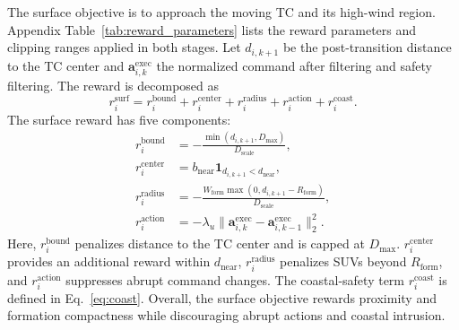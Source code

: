 \documentclass[a4paper,fleqn]{cas-dc}
\begin{document}
The surface objective is to approach the moving TC and its high-wind region.
Appendix Table~\ref{tab:reward_parameters} lists the reward parameters and
clipping ranges applied in both stages. Let \(d_{i,k+1}\) be the post-transition
distance to the TC center and
\(\mathbf{a}_{i,k}^{\mathrm{exec}}\) the normalized command after filtering and safety
filtering.
The reward is decomposed as
\begin{equation}
r_i^{\mathrm{surf}}
=r_i^{\mathrm{bound}}
+r_i^{\mathrm{center}}
+r_i^{\mathrm{radius}}
+r_i^{\mathrm{action}}
+r_i^{\mathrm{coast}}.
\label{eq:surface_reward}
\end{equation}
The surface reward has five components:
\begin{equation}
\begin{aligned}
r_i^{\mathrm{bound}}
&=-\frac{\min(d_{i,k+1},D_{\max})}{D_{\mathrm{scale}}},\\
r_i^{\mathrm{center}}
&=b_{\mathrm{near}}\mathbf{1}_{d_{i,k+1}<d_{\mathrm{near}}},\\
r_i^{\mathrm{radius}}
&=-\frac{W_{\mathrm{form}}
\max(0,d_{i,k+1}-R_{\mathrm{form}})}{D_{\mathrm{scale}}},\\
r_i^{\mathrm{action}}
&=-\lambda_u\|\mathbf{a}_{i,k}^{\mathrm{exec}}
-\mathbf{a}_{i,k-1}^{\mathrm{exec}}\|_2^2.
\end{aligned}
\label{eq:surface_reward_terms}
\end{equation}
Here, \(r_i^{\mathrm{bound}}\) penalizes distance to the TC center and is capped
at \(D_{\max}\). \(r_i^{\mathrm{center}}\) provides an additional reward within
\(d_{\mathrm{near}}\), \(r_i^{\mathrm{radius}}\) penalizes SUVs beyond
\(R_{\mathrm{form}}\), and \(r_i^{\mathrm{action}}\) suppresses abrupt command
changes. The coastal-safety term \(r_i^{\mathrm{coast}}\) is defined in
Eq.~\eqref{eq:coast}. Overall, the surface objective rewards proximity and
formation compactness while discouraging abrupt actions and coastal intrusion.
\end{document}
